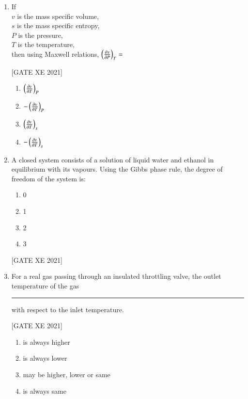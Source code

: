 \documentclass[journal,12pt,onecolumn]{IEEEtran}
\theoremstyle{remark}
\begin{document}
\begin{enumerate}[resume]
\item If \\
$v$ is the mass specific volume, \\
$s$ is the mass specific entropy, \\
$P$ is the pressure, \\
$T$ is the temperature, \\
then using Maxwell relations, $\left(\frac{\partial s}{\partial P}\right)_{T} = $

\hfill[GATE XE 2021]

\begin{multicols}{2}
\begin{enumerate}
    \item $\left(\frac{\partial v}{\partial T}\right)_{P}$
    \item $-\left(\frac{\partial v}{\partial T}\right)_{P}$
    \item $\left(\frac{\partial v}{\partial T}\right)_{s}$
    \item $-\left(\frac{\partial v}{\partial T}\right)_{s}$
\end{enumerate}
\end{multicols}



\item A closed system consists of a solution of liquid water and ethanol in equilibrium with its vapours. Using the Gibbs phase rule, the degree of freedom of the system is:

\begin{multicols}{2}
\begin{enumerate}
    \item 0
    \item 1
    \item 2
    \item 3
\end{enumerate}
\end{multicols}

\hfill[GATE XE 2021]

\item For a real gas passing through an insulated throttling valve, the outlet temperature of the gas \rule{3cm}{0.4pt} with respect to the inlet temperature.

\hfill[GATE XE 2021]

\begin{multicols}{2}
\begin{enumerate}
    \item is always higher
    \item is always lower
    \item may be higher, lower or same
    \item is always same
\end{enumerate}
\end{multicols}



\end{enumerate}
\end{document}
